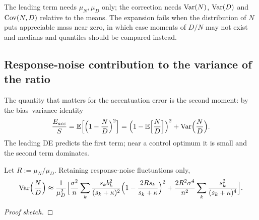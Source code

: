 {The leading term needs $\mu_N,\mu_D$ only; the correction needs
$\mathrm{Var}(N)$, $\mathrm{Var}(D)$ and $\mathrm{Cov}(N,D)$ relative to the means.  The expansion
fails when the distribution of $N$ puts appreciable mass near zero, in which
case moments of $D/N$ may not exist and medians and quantiles should be
compared instead.




\iffalse
\subsection{Response-noise contribution to the variance of the ratio}

The quantity that matters for the accentuation error is the second moment:
by the bias--variance identity
\begin{equation}
\frac{E_{acc}}{S}=\mathbb{E}\Big[\Big(1-\frac ND\Big)^2\Big]
=\Big(1-\mathbb{E}\Big[\frac ND\Big]\Big)^2+\mathrm{Var}\Big(\frac ND\Big).
\label{eq:app-acc-bias-variance}
\end{equation}
The leading DE predicts the first term; near a control optimum it is
small and the second term dominates.

\begin{prop}
Let $R:=\mu_N/\mu_D$.  Retaining response-noise fluctuations only,
\begin{equation}
\mathrm{Var}\Big(\frac ND\Big)\approx\frac1{\mu_D^2}\Big[
\frac{\sigma^2}{n}\sum_k\frac{s_kb_k^2}{(s_k+\kappa)^2}\Big(1-\frac{2Rs_k}{s_k+\kappa}\Big)^2
+\frac{2R^2\sigma^4}{n^2}\sum_k\frac{s_k^2}{(s_k+\kappa)^4}\Big].
\label{eq:app-var-ratio-noise}
\end{equation}
\end{prop}
\begin{proof}[Proof sketch]
\end{proof}

}
